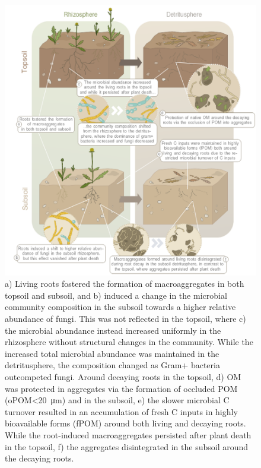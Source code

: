 \begin{figure}[H]
	\centering
	\includegraphics[width=1\textwidth]{img/M5-Figure_4.png}
	\caption{a) Living roots fostered the formation of macroaggregates in both topsoil and subsoil, and b) induced a change in the microbial community composition in the subsoil towards a higher relative abundance of fungi. This was not reflected in the topsoil, where c) the microbial abundance instead increased uniformly in the rhizosphere without structural changes in the community. While the increased total microbial abundance was maintained in the detritusphere, the composition changed as Gram+ bacteria outcompeted fungi. Around decaying roots in the topsoil, d) OM was protected in aggregates via the formation of occluded POM (oPOM<\SI{20}{\micro\metre}) and in the subsoil, e) the slower microbial C turnover resulted in an accumulation of fresh C inputs in highly bioavailable forms (fPOM) around both living and decaying roots. While the root-induced macroaggregates persisted after plant death in the topsoil, f) the aggregates disintegrated in the subsoil around the decaying roots.}
	\label{fig:M5-F4}
\end{figure}

